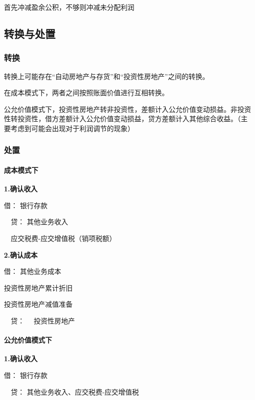 \documentclass[UTF8,12pt]{ctexart}
\newenvironment{Dr}{\noindent 借：}{\par}
\newenvironment{Cr}{\noindent \ \ 贷：}{\par}
\numberwithin{equation}{section} %
\numberwithin{figure}{section}
\numberwithin{table}{section}
\begin{document}
	首先冲减盈余公积，不够则冲减未分配利润
	
	\subsection{转换与处置}
	\subsubsection{转换}
	转换上可能存在“自动房地产与存货”和“投资性房地产”之间的转换。
	
	在成本模式下，两者之间按照账面价值进行互相转换。
	
	公允价值模式下，投资性房地产转非投资性，差额计入公允价值变动损益。非投资性转投资性，借方差额计入公允价值变动损益，贷方差额计入其他综合收益。（主要考虑到可能会出现对于利润调节的现象）
	
	\subsubsection{处置}
	\paragraph{成本模式下}
	
	\textbf{1.确认收入}
	
	\begin{Dr}
		银行存款
	\end{Dr}
	\begin{Cr}
		其他业务收入
		
		\ \ 应交税费-应交增值税（销项税额）
	\end{Cr}

	
	\textbf{2.确认成本}
	
	\begin{Dr}
		其他业务成本
		
		投资性房地产累计折旧
		
		投资性房地产减值准备
	\end{Dr}
	\begin{Cr}
		\ \ 投资性房地产
	\end{Cr}

	
	\paragraph{公允价值模式下}
	\textbf{1.确认收入}
	
	\begin{Dr}
		银行存款
	\end{Dr}
	\begin{Cr}
		其他业务收入、应交税费-应交增值税
	\end{Cr}
	
\end{document}
